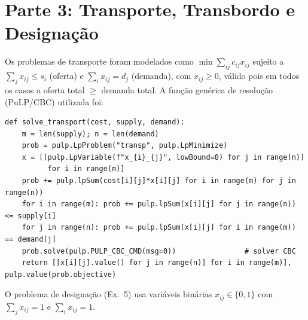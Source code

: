\documentclass[11pt, a4paper]{article}
\begin{document}

\newpage
\section{Parte 3: Transporte, Transbordo e Designa\c{c}\~ao}
Os problemas de transporte foram modelados como
$\min \sum_{ij} c_{ij}x_{ij}$ sujeito a
$\sum_j x_{ij}\le s_i$ (oferta) e $\sum_i x_{ij}= d_j$ (demanda), com
$x_{ij}\ge 0$, v\'alido pois em todos os casos a oferta total $\ge$ demanda
total. A fun\c{c}\~ao gen\'erica de resolu\c{c}\~ao (PuLP/CBC) utilizada foi:
\begin{lstlisting}
def solve_transport(cost, supply, demand):
    m = len(supply); n = len(demand)
    prob = pulp.LpProblem("transp", pulp.LpMinimize)
    x = [[pulp.LpVariable(f"x_{i}_{j}", lowBound=0) for j in range(n)]
          for i in range(m)]
    prob += pulp.lpSum(cost[i][j]*x[i][j] for i in range(m) for j in range(n))
    for i in range(m): prob += pulp.lpSum(x[i][j] for j in range(n)) <= supply[i]
    for j in range(n): prob += pulp.lpSum(x[i][j] for i in range(m)) == demand[j]
    prob.solve(pulp.PULP_CBC_CMD(msg=0))                # solver CBC
    return [[x[i][j].value() for j in range(n)] for i in range(m)], pulp.value(prob.objective)
\end{lstlisting}
O problema de designa\c{c}\~ao (Ex.\ 5) usa vari\'aveis bin\'arias $x_{ij}\in\{0,1\}$
com $\sum_j x_{ij}=1$ e $\sum_i x_{ij}=1$.
\end{document}
